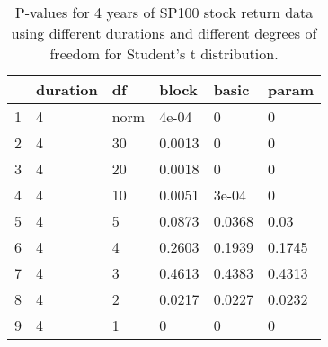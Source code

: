 \begin{table}[ht]
\centering
\caption{P-values for 4 years of SP100 stock return 
                   data using different durations
  and different degrees of freedom for Student's t distribution.} 
\label{table:SP1004}
\begin{tabular}{rlllll}
  \hline
 & duration & df & block & basic & param \\ 
  \hline
1 & 4 & norm & 4e-04 & 0 & 0 \\ 
  2 & 4 & 30 & 0.0013 & 0 & 0 \\ 
  3 & 4 & 20 & 0.0018 & 0 & 0 \\ 
  4 & 4 & 10 & 0.0051 & 3e-04 & 0 \\ 
  5 & 4 & 5 & 0.0873 & 0.0368 & 0.03 \\ 
  6 & 4 & 4 & 0.2603 & 0.1939 & 0.1745 \\ 
  7 & 4 & 3 & 0.4613 & 0.4383 & 0.4313 \\ 
  8 & 4 & 2 & 0.0217 & 0.0227 & 0.0232 \\ 
  9 & 4 & 1 & 0 & 0 & 0 \\ 
   \hline
\end{tabular}
\end{table}

